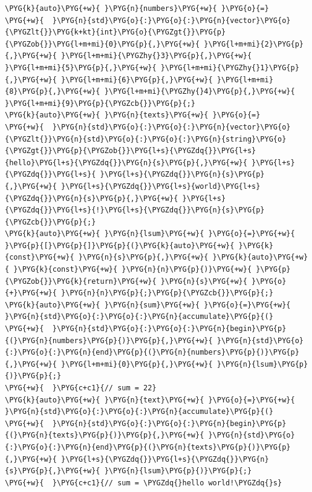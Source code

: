 \begin{codeblockbg}
\begin{Verbatim}[commandchars=\\\{\},breaklines=true,breakanywhere=true,fontsize=\codefont,xleftmargin=17bp]
\PYG{k}{auto}\PYG{+w}{ }\PYG{n}{numbers}\PYG{+w}{ }\PYG{o}{=}
\PYG{+w}{  }\PYG{n}{std}\PYG{o}{:}\PYG{o}{:}\PYG{n}{vector}\PYG{o}{\PYGZlt{}}\PYG{k+kt}{int}\PYG{o}{\PYGZgt{}}\PYG{p}{\PYGZob{}}\PYG{l+m+mi}{0}\PYG{p}{,}\PYG{+w}{ }\PYG{l+m+mi}{2}\PYG{p}{,}\PYG{+w}{ }\PYG{l+m+mi}{\PYGZhy{}3}\PYG{p}{,}\PYG{+w}{ }\PYG{l+m+mi}{5}\PYG{p}{,}\PYG{+w}{ }\PYG{l+m+mi}{\PYGZhy{}1}\PYG{p}{,}\PYG{+w}{ }\PYG{l+m+mi}{6}\PYG{p}{,}\PYG{+w}{ }\PYG{l+m+mi}{8}\PYG{p}{,}\PYG{+w}{ }\PYG{l+m+mi}{\PYGZhy{}4}\PYG{p}{,}\PYG{+w}{ }\PYG{l+m+mi}{9}\PYG{p}{\PYGZcb{}}\PYG{p}{;}
\PYG{k}{auto}\PYG{+w}{ }\PYG{n}{texts}\PYG{+w}{ }\PYG{o}{=}
\PYG{+w}{  }\PYG{n}{std}\PYG{o}{:}\PYG{o}{:}\PYG{n}{vector}\PYG{o}{\PYGZlt{}}\PYG{n}{std}\PYG{o}{:}\PYG{o}{:}\PYG{n}{string}\PYG{o}{\PYGZgt{}}\PYG{p}{\PYGZob{}}\PYG{l+s}{\PYGZdq{}}\PYG{l+s}{hello}\PYG{l+s}{\PYGZdq{}}\PYG{n}{s}\PYG{p}{,}\PYG{+w}{ }\PYG{l+s}{\PYGZdq{}}\PYG{l+s}{ }\PYG{l+s}{\PYGZdq{}}\PYG{n}{s}\PYG{p}{,}\PYG{+w}{ }\PYG{l+s}{\PYGZdq{}}\PYG{l+s}{world}\PYG{l+s}{\PYGZdq{}}\PYG{n}{s}\PYG{p}{,}\PYG{+w}{ }\PYG{l+s}{\PYGZdq{}}\PYG{l+s}{!}\PYG{l+s}{\PYGZdq{}}\PYG{n}{s}\PYG{p}{\PYGZcb{}}\PYG{p}{;}
\PYG{k}{auto}\PYG{+w}{ }\PYG{n}{lsum}\PYG{+w}{ }\PYG{o}{=}\PYG{+w}{ }\PYG{p}{[}\PYG{p}{]}\PYG{p}{(}\PYG{k}{auto}\PYG{+w}{ }\PYG{k}{const}\PYG{+w}{ }\PYG{n}{s}\PYG{p}{,}\PYG{+w}{ }\PYG{k}{auto}\PYG{+w}{ }\PYG{k}{const}\PYG{+w}{ }\PYG{n}{n}\PYG{p}{)}\PYG{+w}{ }\PYG{p}{\PYGZob{}}\PYG{k}{return}\PYG{+w}{ }\PYG{n}{s}\PYG{+w}{ }\PYG{o}{+}\PYG{+w}{ }\PYG{n}{n}\PYG{p}{;}\PYG{p}{\PYGZcb{}}\PYG{p}{;}
\PYG{k}{auto}\PYG{+w}{ }\PYG{n}{sum}\PYG{+w}{ }\PYG{o}{=}\PYG{+w}{ }\PYG{n}{std}\PYG{o}{:}\PYG{o}{:}\PYG{n}{accumulate}\PYG{p}{(}
\PYG{+w}{  }\PYG{n}{std}\PYG{o}{:}\PYG{o}{:}\PYG{n}{begin}\PYG{p}{(}\PYG{n}{numbers}\PYG{p}{)}\PYG{p}{,}\PYG{+w}{ }\PYG{n}{std}\PYG{o}{:}\PYG{o}{:}\PYG{n}{end}\PYG{p}{(}\PYG{n}{numbers}\PYG{p}{)}\PYG{p}{,}\PYG{+w}{ }\PYG{l+m+mi}{0}\PYG{p}{,}\PYG{+w}{ }\PYG{n}{lsum}\PYG{p}{)}\PYG{p}{;}
\PYG{+w}{  }\PYG{c+c1}{// sum = 22}
\PYG{k}{auto}\PYG{+w}{ }\PYG{n}{text}\PYG{+w}{ }\PYG{o}{=}\PYG{+w}{ }\PYG{n}{std}\PYG{o}{:}\PYG{o}{:}\PYG{n}{accumulate}\PYG{p}{(}
\PYG{+w}{  }\PYG{n}{std}\PYG{o}{:}\PYG{o}{:}\PYG{n}{begin}\PYG{p}{(}\PYG{n}{texts}\PYG{p}{)}\PYG{p}{,}\PYG{+w}{ }\PYG{n}{std}\PYG{o}{:}\PYG{o}{:}\PYG{n}{end}\PYG{p}{(}\PYG{n}{texts}\PYG{p}{)}\PYG{p}{,}\PYG{+w}{ }\PYG{l+s}{\PYGZdq{}}\PYG{l+s}{\PYGZdq{}}\PYG{n}{s}\PYG{p}{,}\PYG{+w}{ }\PYG{n}{lsum}\PYG{p}{)}\PYG{p}{;}
\PYG{+w}{  }\PYG{c+c1}{// sum = \PYGZdq{}hello world!\PYGZdq{}s}
\end{Verbatim}
\end{codeblockbg}


